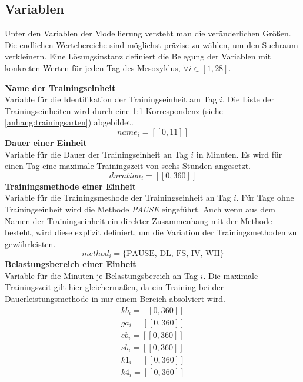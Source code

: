 \subsection{Variablen}
Unter den Variablen der Modellierung versteht man die veränderlichen Größen. Die endlichen Wertebereiche sind möglichst präzise zu wählen, um den Suchraum verkleinern. Eine Lösungsinstanz definiert die Belegung der Variablen mit konkreten Werten für jeden Tag des Mesozyklus, $\forall i \in [1, 28]$.\par
\textbf{Name der Trainingseinheit} \\[0.2em]
Variable für die Identifikation der Trainingseinheit am Tag $i$. Die Liste der Trainingseinheiten wird durch eine 1:1-Korrespondenz (siehe \ref{anhang:trainingsarten}) abgebildet.
\begin{equation}
    name_i = [\![0, 11]\!]
\end{equation}
\textbf{Dauer einer Einheit} \\[0.2em]
Variable für die Dauer der Trainingseinheit an Tag $i$ in Minuten. Es wird für einen Tag eine maximale Trainingszeit von sechs Stunden angesetzt.
\begin{equation} 
    duration_i = [\![0, 360]\!] \end{equation} 
\textbf{Trainingsmethode einer Einheit} \\[0.2em]
Variable für die Trainingsmethode der Trainingseinheit an Tag $i$. Für Tage ohne Trainingseinheit wird die Methode \textit{PAUSE} eingeführt. Auch wenn aus dem Namen der Trainingseinheit ein direkter Zusammenhang mit der Methode besteht, wird diese explizit definiert, um die Variation der Trainingsmethoden zu gewährleisten.
\begin{equation}
    method_i = \{\text{PAUSE, DL, FS, IV, WH}\}
\end{equation} 
\textbf{Belastungsbereich einer Einheit} \\[0.2em]
Variable für die Minuten je Belastungsbereich an Tag $i$. Die maximale Trainingszeit gilt hier gleichermaßen, da ein Training bei der Dauerleistungsmethode in nur einem Bereich absolviert wird. \newline
\begin{equation} 
\begin{array}{c}
    kb_i = [\![0, 360]\!] \\
    ga_i = [\![0, 360]\!] \\
    eb_i = [\![0, 360]\!] \\
    sb_i = [\![0, 360]\!] \\
    k1_i = [\![0, 360]\!] \\
    k4_i = [\![0, 360]\!] \\
\end{array}
\end{equation} 
